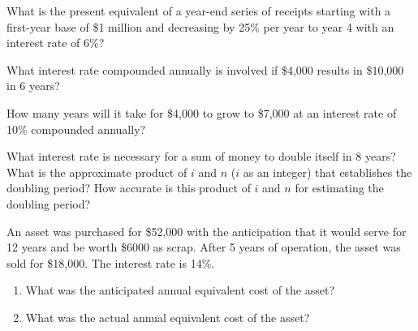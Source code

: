 \begin{exercises}
    \begin{exercise}
    \label{sea-8-5}
        What is the present equivalent of a year-end series of receipts starting with a first-year base of \$1 million and decreasing by 25\% per year to year 4 with an interest rate of 6\%?
    \end{exercise}
    \begin{solution}
    \end{solution}
    
    \begin{exercise}
    \label{sea-8-6}
        What interest rate compounded annually is involved if \$4,000 results in \$10,000 in 6 years?
    \end{exercise}
    \begin{solution}
    \end{solution}
    
    \begin{exercise}
    \label{sea-8-7}
        How many years will it take for \$4,000 to grow to \$7,000 at an interest rate of 10\% compounded annually?
    \end{exercise}
    \begin{solution}
    \end{solution}
    
    \begin{exercise}
    \label{sea-8-8}
        What interest rate is necessary for a sum of money to double itself in 8 years? What is the approximate product of $i$ and $n$ ($i$ as an integer) that establishes the doubling period? How accurate is this product of $i$ and $n$ for estimating the doubling period?
    \end{exercise}
    \begin{solution}
    \end{solution}
    
    \begin{exercise}
    \label{sea-8-9}
        An asset was purchased for \$52,000 with the anticipation that it would serve for 12 years and be worth \$6000 as scrap. After 5 years of operation, the asset was sold for \$18,000. The interest rate is 14\%.
        \begin{enumerate}[label=\alph*)]
            \item What was the anticipated annual equivalent cost of the asset?
            \item What was the actual annual equivalent cost of the asset?
        \end{enumerate}
    \end{exercise}
    \begin{solution}
    \end{solution}
    

\end{exercises}
